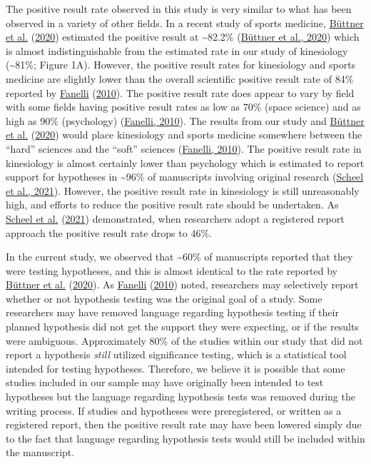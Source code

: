 \documentclass[]{cik}%
\begin{document}
The positive result rate observed in this study is very similar to what
has been observed in a variety of other fields. In a recent study of
sports medicine, \protect\hyperlink{ref-buttner_2020}{Büttner et al.}
(\protect\hyperlink{ref-buttner_2020}{2020}) estimated the positive
result at \textasciitilde82.2\%
(\protect\hyperlink{ref-buttner_2020}{Büttner et al., 2020}) which is
almost indistinguishable from the estimated rate in our study of
kinesiology (\textasciitilde81\%; Figure 1A). However, the positive
result rates for kinesiology and sports medicine are slightly lower than
the overall scientific positive result rate of 84\% reported by
\protect\hyperlink{ref-fanelli_positive_2010}{Fanelli}
(\protect\hyperlink{ref-fanelli_positive_2010}{2010}). The positive
result rate does appear to vary by field with some fields having
positive result rates as low as 70\% (space science) and as high as 90\%
(psychology) (\protect\hyperlink{ref-fanelli_positive_2010}{Fanelli,
2010}). The results from our study and
\protect\hyperlink{ref-buttner_2020}{Büttner et al.}
(\protect\hyperlink{ref-buttner_2020}{2020}) would place kinesiology and
sports medicine somewhere between the ``hard'' sciences and the ``soft''
sciences (\protect\hyperlink{ref-fanelli_positive_2010}{Fanelli, 2010}).
The positive result rate in kinesiology is almost certainly lower than
psychology which is estimated to report support for hypotheses in
\textasciitilde96\% of manuscripts involving original research
(\protect\hyperlink{ref-scheel_excess_2020}{Scheel et al., 2021}).
However, the positive result rate in kinesiology is still unreasonably
high, and efforts to reduce the positive result rate should be
undertaken. As \protect\hyperlink{ref-scheel_excess_2020}{Scheel et al.}
(\protect\hyperlink{ref-scheel_excess_2020}{2021}) demonstrated, when
researchers adopt a registered report approach the positive result rate
drops to 46\%.

In the current study, we observed that \textasciitilde60\% of
manuscripts reported that they were testing hypotheses, and this is
almost identical to the rate reported by
\protect\hyperlink{ref-buttner_2020}{Büttner et al.}
(\protect\hyperlink{ref-buttner_2020}{2020}). As
\protect\hyperlink{ref-fanelli_positive_2010}{Fanelli}
(\protect\hyperlink{ref-fanelli_positive_2010}{2010}) noted, researchers
may selectively report whether or not hypothesis testing was the
original goal of a study. Some researchers may have removed language
regarding hypothesis testing if their planned hypothesis did not get the
support they were expecting, or if the results were ambiguous.
Approximately 80\% of the studies within our study that did not report a
hypothesis \emph{still} utilized significance testing, which is a
statistical tool intended for testing hypotheses. Therefore, we believe
it is possible that some studies included in our sample may have
originally been intended to test hypotheses but the language regarding
hypothesis tests was removed during the writing process. If studies and
hypotheses were preregistered, or written as a registered report, then
the positive result rate may have been lowered simply due to the fact
that language regarding hypothesis tests would still be included within
the manuscript.
\end{document}
